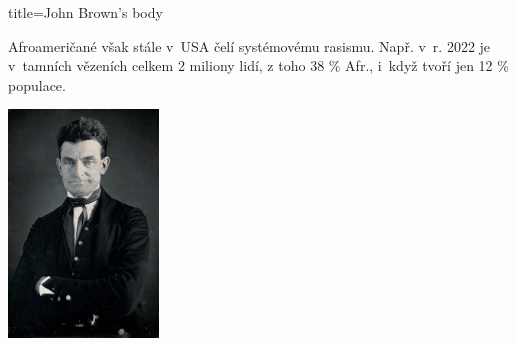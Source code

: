 \begin{song}{title=\predtitle \centering John Brown's body \\\large  }
{\begin{centerjustified}
\begin{varwidth}[t]{0.55\textwidth}
\begin{varwidth}{.5\textwidth}
Afroameričané však stále v~USA čelí systémovému rasismu.
Např. v~r. 2022 je v~tamních vězeních celkem 2 miliony lidí, z toho 38 \% Afr.,
i~když tvoří jen 12 \% populace.
\end{varwidth}
\begin{varwidth}{.2\textwidth}
\includegraphics[width=4cm]{../img/JohnBrown.jpg}
\end{varwidth}



\end{varwidth}
\end{centerjustified}


}




\setcounter{Slokočet}{0}
\end{song}

